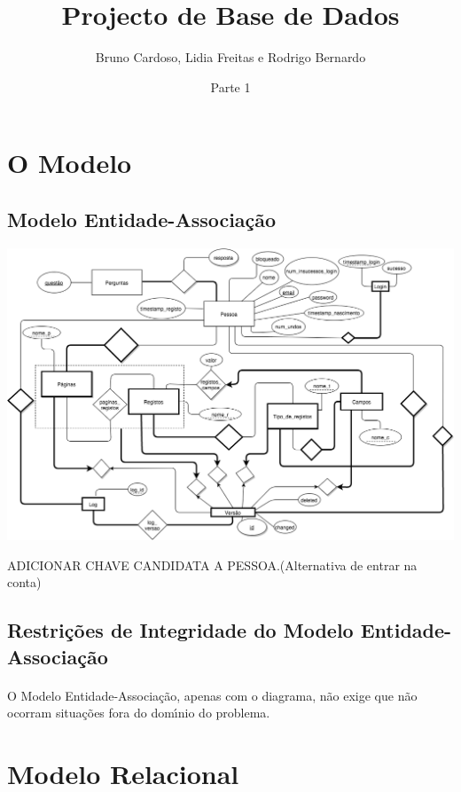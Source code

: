 \documentclass[11pt,a4paper]{article}
\title{\textbf{Projecto de Base de Dados}}
\author{Bruno Cardoso, Lidia Freitas e Rodrigo Bernardo}
\affil{Instituto Superior T\'{e}cnico}
\date{Parte 1}
\begin{document}
\maketitle

\newpage


\tableofcontents %
\newpage
\setcounter{page}{1}
\section{O Modelo}
\subsection{Modelo Entidade-Associa\c{c}\~ao}

\centerline{\includegraphics[width=1.0\textwidth]{modelo-ea.png}}


ADICIONAR CHAVE CANDIDATA A PESSOA.(Alternativa de entrar na conta)
\newpage
\subsection{Restri\c{c}\~oes de Integridade do Modelo Entidade-Associa\c{c}\~ao}

\paragraph{}

O Modelo Entidade-Associa\c{c}\~{a}o, apenas com o diagrama, n\~{a}o exige que n\~{a}o ocorram situa\c{c}\~{o}es fora do dom\'{\i}nio do problema.




\section{Modelo Relacional}
\end{document}
